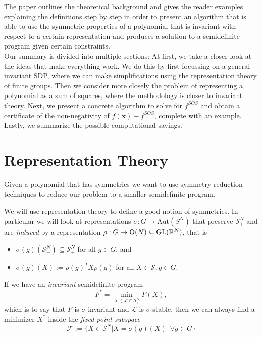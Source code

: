 \documentclass[]{article}
\begin{document}
The paper outlines the theoretical background and gives the reader examples explaining the definitions step by step in order to present an algorithm that is able to use the 
symmetric properties of a polynomial that is invariant with respect to a certain representation and produces a solution to a semidefinite program given certain constraints.\\


Our summary is divided into multiple sections: 
At first, we take a closer look at the ideas that make everything work. We do this by first focussing on a general invariant SDP, where we can make simplifications using the representation theory of finite groups. Then we consider more closely the problem of representing a polynomial as a sum of squares, where the methodology is closer to invariant theory.
Next, we present a concrete algorithm to solve for $f^{SOS}$ and obtain a certificate of the non-negativity of $f(\mathbf{x})-f^{SOS}$, complete with an example. Lastly, we summarize the possible computational savings.\\%

\section*{Representation Theory}

Given a polynomial that has symmetries we want to use symmetry reduction techniques to reduce our problem to a smaller semidefinite program.

We will use representation theory to define a good notion of symmetries. In particular we will look at representations
$\sigma:G\rightarrow \mathrm{Aut}(S^N)$ that preserve $\mathcal{S}_+^N$ and are \textit{induced} by a representation $\rho:G\rightarrow \mathrm{O}(N)\subseteq\mathrm{GL}(\mathbb R^N)$, 
that is 
\begin{itemize}
    \item $\sigma(g)(\mathcal{S}_+^N)\subseteq \mathcal{S}_+^N$ for all $g\in G$, and
    \item $\sigma(g)(X) := \rho(g)^TX\rho(g)$ for all $X\in \mathcal{S} , g\in G.$
\end{itemize}

If we have an \textit{invariant} semidefinite program 
\[
    F^\ast=\min_{X\in\mathcal{L}\cap\mathcal{S}_+^N}F(X),
\]
which is to say that $F$ is $\sigma$-invariant and $\mathcal{L}$ is $\sigma$-stable, then we can always find a minimizer $X^\ast$ inside the \textit{fixed-point subspace} 
\[
    \mathcal{F} := \{X\in\mathcal{S}^N | X= \sigma(g)(X)\,\,\, \forall g \in G\}
\]
\end{document}
